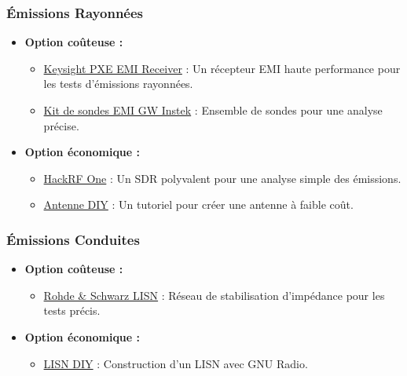 \documentclass[a4paper,12pt]{article}
\begin{document}
\subsubsection{Émissions Rayonnées}
\begin{itemize}
    \item \textbf{Option coûteuse :}
          \begin{itemize}
              \item \href{https://www.keysight.com/us/en/product/N9048B/pxe-emi-receiver-1-hz-44-ghz.html}{Keysight PXE EMI Receiver} : Un récepteur EMI haute performance pour les tests d'émissions rayonnées.
              \item \href{https://eleshop.fr/gw-instek-gkt-008-emi-probe-kit.html}{Kit de sondes EMI GW Instek} : Ensemble de sondes pour une analyse précise.
          \end{itemize}
    \item \textbf{Option économique :}
          \begin{itemize}
              \item \href{https://greatscottgadgets.com/hackrf/one/}{HackRF One} : Un SDR polyvalent pour une analyse simple des émissions.
              \item \href{https://www.youtube.com/watch?v=2xy3Hm1_ZqI}{Antenne DIY} : Un tutoriel pour créer une antenne à faible coût.
          \end{itemize}
\end{itemize}

\subsubsection{Émissions Conduites}
\begin{itemize}
    \item \textbf{Option coûteuse :}
          \begin{itemize}
              \item \href{https://www.rohde-schwarz.com/fr/produits/test-et-mesure/tests-conduits/rs-hm6050-two-line-v-network-lisn_63493-48135.html}{Rohde \& Schwarz LISN} : Réseau de stabilisation d'impédance pour les tests précis.
          \end{itemize}
    \item \textbf{Option économique :}
          \begin{itemize}
              \item \href{https://hackaday.io/project/181265-diy-cispr-25-lisn}{LISN DIY} : Construction d’un LISN avec GNU Radio.
          \end{itemize}
\end{itemize}
\end{document}

